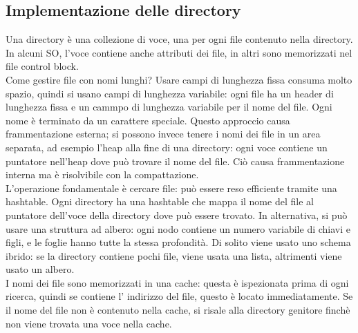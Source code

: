 \documentclass[12pt]{article}
\begin{document}
\subsection{Implementazione delle directory}
Una directory è una collezione di voce, una per ogni file contenuto nella directory. In alcuni SO, l'voce contiene
anche attributi dei file, in altri sono memorizzati nel file control block.\\
Come gestire file con nomi lunghi? Usare campi di lunghezza fissa consuma molto spazio, quindi si usano campi di
lunghezza variabile: ogni file ha un header di lunghezza fissa e un cammpo di lunghezza variabile per il nome del file.
Ogni nome è terminato da un carattere speciale. Questo approccio causa frammentazione esterna; si possono invece tenere
i nomi dei file in un area separata, ad esempio l'heap alla fine di una directory: ogni voce contiene un puntatore
nell'heap dove può trovare il nome del file. Ciò causa frammentazione interna ma è risolvibile con la compattazione.\\
L'operazione fondamentale è cercare file: può essere reso efficiente tramite una hashtable. Ogni directory ha una
hashtable che mappa il nome del file al puntatore dell'voce della directory dove può essere trovato.
In alternativa, si può usare una struttura ad albero: ogni nodo contiene un numero variabile di chiavi e figli, e le 
foglie hanno tutte la stessa profondità. Di solito viene usato uno schema ibrido: se la directory contiene pochi file,
viene usata una lista, altrimenti viene usato un albero.\\
I nomi dei file sono memorizzati in una cache: questa è ispezionata prima di ogni ricerca, quindi se contiene l'
indirizzo del file, questo è locato immediatamente. Se il nome del file non è contenuto nella cache, si risale alla
directory genitore finchè non viene trovata una voce nella cache.
\end{document}
